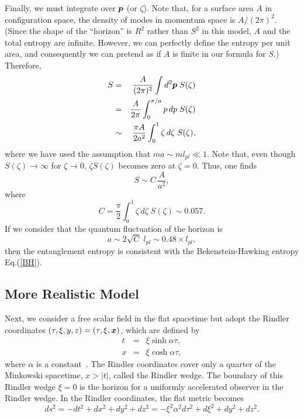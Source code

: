 Finally, we must integrate over $\mbox{\boldmath $p$}$ (or $\zeta$).
Note that, for a surface area $A$ in configuration space,
the density of modes in momentum space is $A/(2\pi)^2$.
(Since the shape of the ``horizon'' is $R^2$ rather than $S^2$
in this model, $A$ and the total entropy are infinite.
However, we can perfectly define the entropy per unit area,
and consequently we can pretend as if $A$ is finite
in our formula for $S$.)
Therefore,
\begin{eqnarray}
  S &=&\frac{A}{(2\pi)^2}\int d^2\mbox{\boldmath $p$} \;S(\zeta) \nonumber \\
    &=&\frac{A}{2\pi}\int^{\pi/a}_0 p\,dp\; S(\zeta) \nonumber \\
    &\sim &\frac{\pi A}{2a^2 }\int^1_0 
         \zeta\, d\zeta \;S(\zeta),
\end{eqnarray}
where we have used the assumption that $ma\sim ml_{pl}\ll 1$.
Note that, even though $S(\zeta)\to\infty$ for $\zeta\to0$,
$\zeta S(\zeta)$ becomes zero at $\zeta=0$.
Thus, one finds
\begin{equation}
  S\sim C\,\frac{A}{a^2},
\end{equation}
where
\begin{equation}
  C=\frac{\pi}{2}\int^1_0 
    \zeta\, d\zeta \;S(\zeta)\sim 0.057.
\end{equation}
If we consider that the quantum fluctuation of the horizon is
\begin{equation}
  a \sim 2\sqrt{C}\; l_{pl} \sim 0.48 \times l_{pl} ,
\end{equation}
then the entanglement entropy is consistent with 
the Bekenstein-Hawking entropy Eq.(\ref{BH}).

\subsection{More Realistic Model}
Next, we consider a free scalar field in the flat spacetime but
adopt the Rindler coordinates
$(\tau,\xi,y,z)=(\tau,\xi,\mbox{\boldmath $x$})$, which are defined by
\begin{eqnarray}
  t&=&\xi\sinh \alpha\tau,  \nonumber \\
  x&=&\xi\cosh \alpha\tau,
\end{eqnarray}
where $\alpha$ is a constant~\cite{Rindle66}.
The Rindler coordinates cover only
a quarter of the Minkowski spacetime, $x>|t|$,
called the Rindler wedge.
The boundary of this Rindler wedge $\xi=0$ is
the horizon for a uniformly accelerated observer
in the Rindler wedge.
In the Rindler coordinates, the flat metric becomes
\begin{equation}
  ds^2=-dt^2+dx^2+dy^2+dz^2=
   -\xi^2\alpha^2 d\tau^2+d\xi^2+dy^2+dz^2.
\label{Rindler}
\end{equation}


